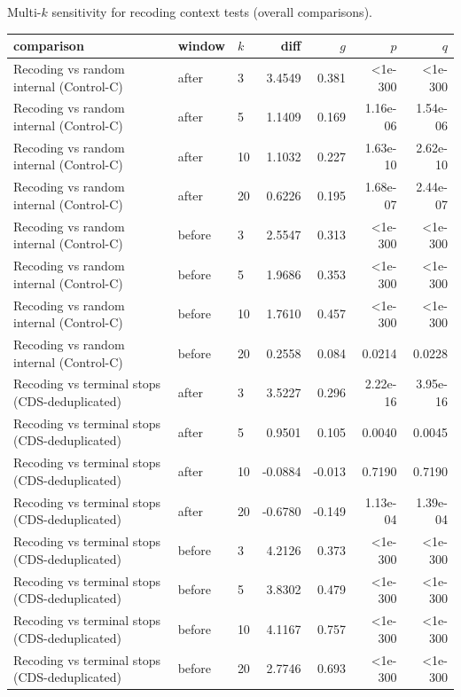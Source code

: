 Multi-$k$ sensitivity for recoding context tests (overall comparisons).

\begin{center}
\scriptsize
\setlength{\tabcolsep}{4pt}
\renewcommand{\arraystretch}{1.10}
\begin{tabular}{>{\raggedright\arraybackslash}p{5.2cm}llrrrr}
\toprule
comparison & window & $k$ & diff & $g$ & $p$ & $q$ \\
\midrule
Recoding vs random internal (Control-C) & after & 3 & 3.4549 & 0.381 & <1e-300 & <1e-300 \\
Recoding vs random internal (Control-C) & after & 5 & 1.1409 & 0.169 & 1.16e-06 & 1.54e-06 \\
Recoding vs random internal (Control-C) & after & 10 & 1.1032 & 0.227 & 1.63e-10 & 2.62e-10 \\
Recoding vs random internal (Control-C) & after & 20 & 0.6226 & 0.195 & 1.68e-07 & 2.44e-07 \\
Recoding vs random internal (Control-C) & before & 3 & 2.5547 & 0.313 & <1e-300 & <1e-300 \\
Recoding vs random internal (Control-C) & before & 5 & 1.9686 & 0.353 & <1e-300 & <1e-300 \\
Recoding vs random internal (Control-C) & before & 10 & 1.7610 & 0.457 & <1e-300 & <1e-300 \\
Recoding vs random internal (Control-C) & before & 20 & 0.2558 & 0.084 & 0.0214 & 0.0228 \\
Recoding vs terminal stops (CDS-deduplicated) & after & 3 & 3.5227 & 0.296 & 2.22e-16 & 3.95e-16 \\
Recoding vs terminal stops (CDS-deduplicated) & after & 5 & 0.9501 & 0.105 & 0.0040 & 0.0045 \\
Recoding vs terminal stops (CDS-deduplicated) & after & 10 & -0.0884 & -0.013 & 0.7190 & 0.7190 \\
Recoding vs terminal stops (CDS-deduplicated) & after & 20 & -0.6780 & -0.149 & 1.13e-04 & 1.39e-04 \\
Recoding vs terminal stops (CDS-deduplicated) & before & 3 & 4.2126 & 0.373 & <1e-300 & <1e-300 \\
Recoding vs terminal stops (CDS-deduplicated) & before & 5 & 3.8302 & 0.479 & <1e-300 & <1e-300 \\
Recoding vs terminal stops (CDS-deduplicated) & before & 10 & 4.1167 & 0.757 & <1e-300 & <1e-300 \\
Recoding vs terminal stops (CDS-deduplicated) & before & 20 & 2.7746 & 0.693 & <1e-300 & <1e-300 \\
\bottomrule
\end{tabular}
\end{center}

